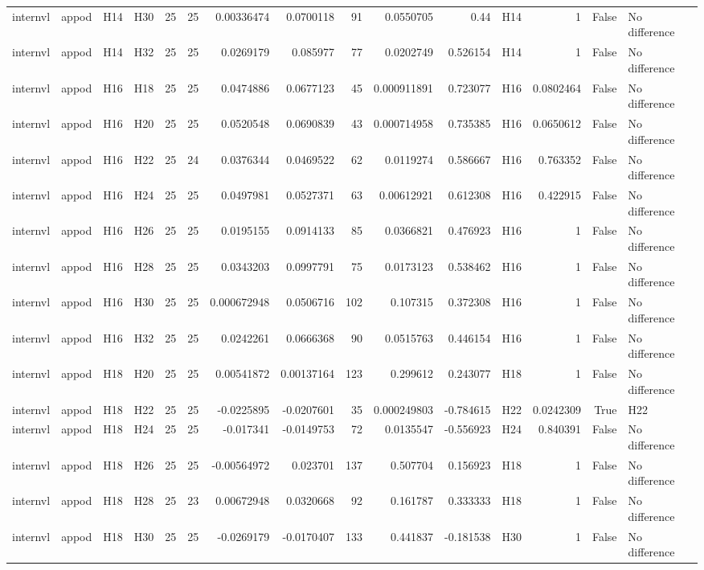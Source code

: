 \begin{longtable}{llllrrrrrrrlrrl}
internvl & appod & H14 & H30 & 25 & 25 & 0.00336474 & 0.0700118 & 91 & 0.0550705 & 0.44 & H14 & 1 & False & No difference \\
internvl & appod & H14 & H32 & 25 & 25 & 0.0269179 & 0.085977 & 77 & 0.0202749 & 0.526154 & H14 & 1 & False & No difference \\
internvl & appod & H16 & H18 & 25 & 25 & 0.0474886 & 0.0677123 & 45 & 0.000911891 & 0.723077 & H16 & 0.0802464 & False & No difference \\
internvl & appod & H16 & H20 & 25 & 25 & 0.0520548 & 0.0690839 & 43 & 0.000714958 & 0.735385 & H16 & 0.0650612 & False & No difference \\
internvl & appod & H16 & H22 & 25 & 24 & 0.0376344 & 0.0469522 & 62 & 0.0119274 & 0.586667 & H16 & 0.763352 & False & No difference \\
internvl & appod & H16 & H24 & 25 & 25 & 0.0497981 & 0.0527371 & 63 & 0.00612921 & 0.612308 & H16 & 0.422915 & False & No difference \\
internvl & appod & H16 & H26 & 25 & 25 & 0.0195155 & 0.0914133 & 85 & 0.0366821 & 0.476923 & H16 & 1 & False & No difference \\
internvl & appod & H16 & H28 & 25 & 25 & 0.0343203 & 0.0997791 & 75 & 0.0173123 & 0.538462 & H16 & 1 & False & No difference \\
internvl & appod & H16 & H30 & 25 & 25 & 0.000672948 & 0.0506716 & 102 & 0.107315 & 0.372308 & H16 & 1 & False & No difference \\
internvl & appod & H16 & H32 & 25 & 25 & 0.0242261 & 0.0666368 & 90 & 0.0515763 & 0.446154 & H16 & 1 & False & No difference \\
internvl & appod & H18 & H20 & 25 & 25 & 0.00541872 & 0.00137164 & 123 & 0.299612 & 0.243077 & H18 & 1 & False & No difference \\
internvl & appod & H18 & H22 & 25 & 25 & -0.0225895 & -0.0207601 & 35 & 0.000249803 & -0.784615 & H22 & 0.0242309 & True & H22 \\
internvl & appod & H18 & H24 & 25 & 25 & -0.017341 & -0.0149753 & 72 & 0.0135547 & -0.556923 & H24 & 0.840391 & False & No difference \\
internvl & appod & H18 & H26 & 25 & 25 & -0.00564972 & 0.023701 & 137 & 0.507704 & 0.156923 & H18 & 1 & False & No difference \\
internvl & appod & H18 & H28 & 25 & 23 & 0.00672948 & 0.0320668 & 92 & 0.161787 & 0.333333 & H18 & 1 & False & No difference \\
internvl & appod & H18 & H30 & 25 & 25 & -0.0269179 & -0.0170407 & 133 & 0.441837 & -0.181538 & H30 & 1 & False & No difference \\

\end{longtable}
